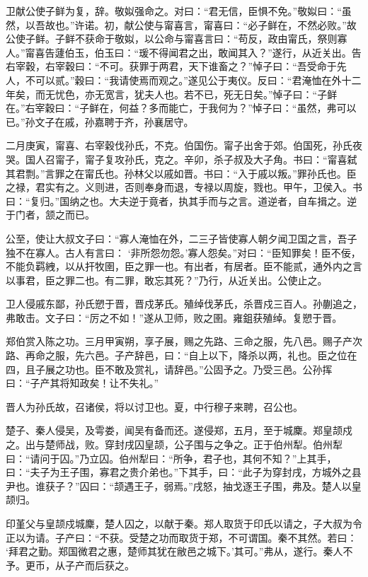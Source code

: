 \documentclass[a4paper,12pt,UTF8,twoside]{ctexbook}
\begin{document}
卫献公使子鲜为复，辞。敬姒强命之。对曰：“君无信，臣惧不免。”敬姒曰：“虽然，以吾故也。”许诺。初，献公使与甯喜言，甯喜曰：“必子鲜在，不然必败。”故公使子鲜。子鲜不获命于敬姒，以公命与甯喜言曰：“苟反，政由甯氏，祭则寡人。”甯喜告蘧伯玉，伯玉曰：“瑗不得闻君之出，敢闻其入？”遂行，从近关出。告右宰穀，右宰穀曰：“不可。获罪于两君，天下谁畜之？”悼子曰：“吾受命于先人，不可以贰。”穀曰：“我请使焉而观之。”遂见公于夷仪。反曰：“君淹恤在外十二年矣，而无忧色，亦无宽言，犹夫人也。若不已，死无日矣。”悼子曰：“子鲜在。”右宰穀曰：“子鲜在，何益？多而能亡，于我何为？”悼子曰：“虽然，弗可以已。”孙文子在戚，孙嘉聘于齐，孙襄居守。

二月庚寅，甯喜、右宰穀伐孙氏，不克。伯国伤。甯子出舍于郊。伯国死，孙氏夜哭。国人召甯子，甯子复攻孙氏，克之。辛卯，杀子叔及大子角。书曰：“甯喜弑其君剽。”言罪之在甯氏也。孙林父以戚如晋。书曰：“入于戚以叛。”罪孙氏也。臣之禄，君实有之。义则进，否则奉身而退，专禄以周旋，戮也。甲午，卫侯入。书曰：“复归。”国纳之也。大夫逆于竟者，执其手而与之言。道逆者，自车揖之。逆于门者，颔之而已。

公至，使让大叔文子曰：“寡人淹恤在外，二三子皆使寡人朝夕闻卫国之言，吾子独不在寡人。古人有言曰： ‘非所怨勿怨。’寡人怨矣。”对曰：“臣知罪矣！臣不佞，不能负羁絏，以从扞牧圉，臣之罪一也。有出者，有居者。臣不能贰，通外内之言以事君，臣之罪二也。有二罪，敢忘其死？”乃行，从近关出。公使止之。

卫人侵戚东鄙，孙氏愬于晋，晋戍茅氏。殖绰伐茅氏，杀晋戍三百人。孙蒯追之，弗敢击。文子曰：“厉之不如！”遂从卫师，败之圉。雍鉏获殖绰。复愬于晋。

郑伯赏入陈之功。三月甲寅朔，享子展，赐之先路、三命之服，先八邑。赐子产次路、再命之服，先六邑。子产辞邑，曰：“自上以下，降杀以两，礼也。臣之位在四，且子展之功也。臣不敢及赏礼，请辞邑。”公固予之。乃受三邑。公孙挥曰：“子产其将知政矣！让不失礼。”

晋人为孙氏故，召诸侯，将以讨卫也。夏，中行穆子来聘，召公也。

楚子、秦人侵吴，及雩娄，闻吴有备而还。遂侵郑，五月，至于城麇。郑皇颉戍之。出与楚师战，败。穿封戌囚皇颉，公子围与之争之。正于伯州犁。伯州犁曰：“请问于囚。”乃立囚。伯州犁曰：“所争，君子也，其何不知？”上其手，曰：“夫子为王子围，寡君之贵介弟也。”下其手，曰：“此子为穿封戌，方城外之县尹也。谁获子？”囚曰：“颉遇王子，弱焉。”戌怒，抽戈逐王子围，弗及。楚人以皇颉归。

印堇父与皇颉戍城麇，楚人囚之，以献于秦。郑人取货于印氏以请之，子大叔为令正以为请。子产曰：“不获。受楚之功而取货于郑，不可谓国。秦不其然。若曰： ‘拜君之勤。郑国微君之惠，楚师其犹在敝邑之城下。’其可。”弗从，遂行。秦人不予。更币，从子产而后获之。
\end{document}
